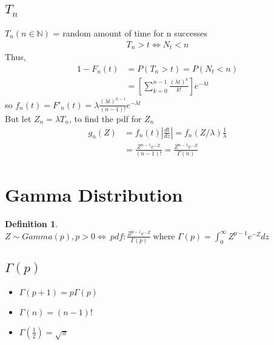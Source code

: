 \documentclass{article}
\theoremstyle{definition}
\newtheorem{definition}{Definition}[section]
\theoremstyle{thrm}
\theoremstyle{lma}
\theoremstyle{ppst}
\theoremstyle{crlr}
\begin{document}
\subsection{$T_n$}
$T_n(n\in \mathbb{N})$ = random amount of time for n successes
\begin{align*}
	T_n>t \iff N_t<n
\end{align*}
Thus, 
\begin{align*}
	1-F_n(t)&=P(T_n>t) = P(N_t<n)\\
	&=[\sum_{k=0}^{n-1}\frac{(\lambda t)^k}{k!}]e^{-\lambda t}	
\end{align*}
so $f_n(t) = F'_n(t) = \lambda \frac{(\lambda t)^{n-1}}{(n-1)!}e^{-\lambda t}$\\
But let $Z_n = \lambda T_n$, to find the pdf for $Z_n$
\begin{align*}
	g_n(Z) &= f_n(t)|\frac{dt}{dz}| = f_n(Z/\lambda)\frac{1}{\lambda}\\
	&= \frac{Z^{n-1}e^{-Z}}{(n-1)!} = \frac{Z^{n-1}e^{-Z}}{\Gamma(n)}
\end{align*}

\section{Gamma Distribution}
\begin{definition}
	$Z\sim Gamma(p), p>0 \iff \ pdf:\frac{Z^{p-1}e^{-Z}}{\Gamma(p)}\ \text{where } \Gamma(p) = \int_0^\infty Z^{p-1}e^{-Z}dz$
\end{definition}
\subsection{$\Gamma(p)$}
\begin{itemize}
	\item $\Gamma(p+1) = p\Gamma(p)$
	\item $\Gamma(n) = (n-1)!$
	\item $\Gamma(\frac{1}{2}) = \sqrt{\pi}$ 
\end{itemize}
\end{document}
